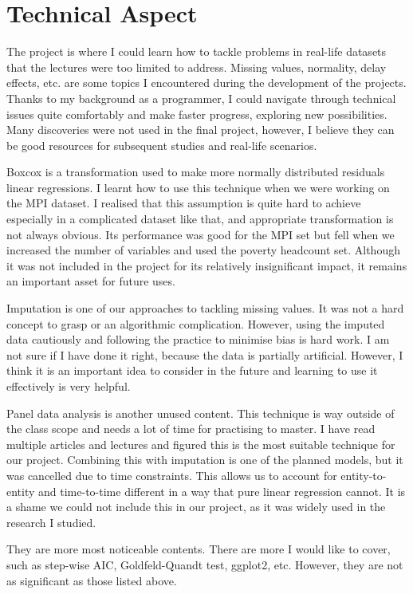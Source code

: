 \documentclass[10pt,a4paper]{article}
\begin{document}
\section{Technical Aspect}

The project is where I could learn how to tackle problems in real-life datasets that the lectures were too limited to address. Missing values, normality, delay effects, etc. are some topics I encountered during the development of the projects. Thanks to my background as a programmer, I could navigate through technical issues quite comfortably and make faster progress, exploring new possibilities. Many discoveries were not used in the final project, however, I believe they can be good resources for subsequent studies and real-life scenarios.

Boxcox is a transformation used to make more normally distributed residuals linear regressions. I learnt how to use this technique when we were working on the MPI dataset. I realised that this assumption is quite hard to achieve especially in a complicated dataset like that, and appropriate transformation is not always obvious. Its performance was good for the MPI set but fell when we increased the number of variables and used the poverty headcount set. Although it was not included in the project for its relatively insignificant impact, it remains an important asset for future uses.

Imputation is one of our approaches to tackling missing values. It was not a hard concept to grasp or an algorithmic complication. However, using the imputed data cautiously and following the practice to minimise bias is hard work. I am not sure if I have done it right, because the data is partially artificial. However, I think it is an important idea to consider in the future and learning to use it effectively is very helpful.

Panel data analysis is another unused content. This technique is way outside of the class scope and needs a lot of time for practising to master. I have read multiple articles and lectures and figured this is the most suitable technique for our project. Combining this with imputation is one of the planned models, but it was cancelled due to time constraints. This allows us to account for entity-to-entity and time-to-time different in a way that pure linear regression cannot. It is a shame we could not include this in our project, as it was widely used in the research I studied.

They are more most noticeable contents. There are more I would like to cover, such as step-wise AIC, Goldfeld-Quandt test, ggplot2, etc. However, they are not as significant as those listed above.
\end{document}
